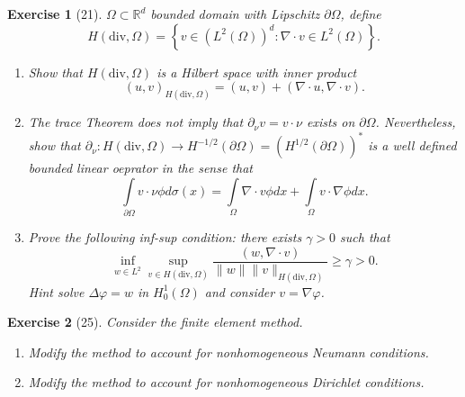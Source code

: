 \documentclass[letterpaper,twoside,11pt]{article}
\theoremstyle{mystyle}
\newtheorem*{exercise}{Exercise}
\newcommand{\R}{{\mathbb R}}
\begin{document}
\begin{exercise}[21]
  $\Omega \subset \R^d$ bounded domain with Lipschitz $\partial \Omega$, define 
  \[H\left( \text{div}, \Omega \right) = \left\{ v\in (L^2(\Omega))^d : \nabla \cdot v \in L^2 (\Omega )\right\}.\]
\begin{enumerate}
  \item Show that $H\left( \text{div}, \Omega \right)$ is a Hilbert space with inner product 
  \[\left( u,v \right)_{H(\text{div}, \Omega)} = \left( u,v \right) + \left( \nabla \cdot u, \nabla \cdot v \right).\]
  \item The trace Theorem does not imply that $\partial_\nu v = v \cdot \nu$ exists on $\partial \Omega$. Nevertheless, show that $\partial_\nu : H\left( \text{div}, \Omega \right) \to H^{-1/2} \left( \partial \Omega \right) = \left( H^{1/2}(\partial \Omega) \right)^*$ is a well defined bounded linear oeprator in the sense that 
  \[\int\limits_{\partial \Omega} v \cdot \nu \phi d\sigma(x) = \int\limits_{\Omega} \nabla \cdot v \phi dx + \int\limits_{\Omega} v\cdot \nabla \phi dx.\]
  \item Prove the following inf-sup condition: there exists $\gamma > 0$ such that 
  \[\inf_{w\in L^2} \sup_{v\in H(\text{div},\Omega)} \frac{(w, \nabla \cdot v)}{\|w\| \|v\|_{H(\text{div}, \Omega)}}\geq \gamma > 0.\]
  Hint solve $\Delta \varphi = w$ in $H_0^1 \left( \Omega \right)$ and consider $v  = \nabla \varphi$. 

\end{enumerate}
\end{exercise}

\begin{exercise}[25] 
  Consider the finite element method. 
  \begin{enumerate}
    \item Modify the method to account for nonhomogeneous Neumann conditions. 
    \item Modify the method to account for nonhomogeneous Dirichlet conditions. 
  \end{enumerate}
\end{exercise}
\end{document}
